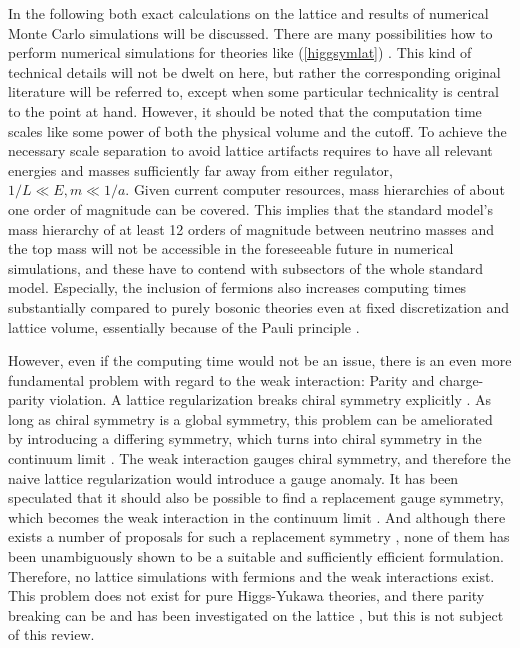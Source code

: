 \documentclass[final,12pt]{article}
\newcommand*{\pref}[1]{(\ref{#1})}
\newcommand*{\1}{1\!\!\!\bot}
\begin{document}
In the following both exact calculations on the lattice and results of numerical Monte Carlo simulations will be discussed. There are many possibilities how to perform numerical simulations for theories like \pref{higgsymlat} \cite{Montvay:1994cy,DeGrand:2006zz}. This kind of technical details will not be dwelt on here, but rather the corresponding original literature will be referred to, except when some particular technicality is central to the point at hand. However, it should be noted that the computation time scales like some power of both the physical volume and the cutoff. To achieve the necessary scale separation to avoid lattice artifacts requires to have all relevant energies and masses sufficiently far away from either regulator, $1/L\ll E,m\ll 1/a$. Given current computer resources, mass hierarchies of about one order of magnitude can be covered. This implies that the standard model's mass hierarchy of at least 12 orders of magnitude between neutrino masses and the top mass will not be accessible in the foreseeable future in numerical simulations, and these have to contend with subsectors of the whole standard model. Especially, the inclusion of fermions also increases computing times substantially compared to purely bosonic theories even at fixed discretization and lattice volume, essentially because of the Pauli principle \cite{Gattringer:2010zz,DeGrand:2006zz}.

However, even if the computing time would not be an issue, there is an even more fundamental problem with regard to the weak interaction: Parity and charge-parity violation. A lattice regularization breaks chiral symmetry explicitly \cite{Montvay:1994cy,Gattringer:2010zz,DeGrand:2006zz}. As long as chiral symmetry is a global symmetry, this problem can be ameliorated by introducing a differing symmetry, which turns into chiral symmetry in the continuum limit \cite{Gattringer:2010zz,DeGrand:2006zz}. The weak interaction gauges chiral symmetry, and therefore the naive lattice regularization would introduce a gauge anomaly. It has been speculated that it should also be possible to find a replacement gauge symmetry, which becomes the weak interaction in the continuum limit \cite{Hasenfratz:2007dp}. And although there exists a number of proposals for such a replacement symmetry \cite{Grabowska:2015qpk,Gattringer:2008je,Cundy:2010pu,Igarashi:2009kj,Xue:2000du}, none of them has been unambiguously shown to be a suitable and sufficiently efficient formulation. Therefore, no lattice simulations with fermions and the weak interactions exist. This problem does not exist for pure Higgs-Yukawa theories, and there parity breaking can be and has been investigated on the lattice \cite{Fodor:2007fn,Gerhold:2007gx,Gerhold:2010bh,Gerhold:2011mx,Chu:2015nha,Bulava:2012rb}, but this is not subject of this review.
\end{document}
